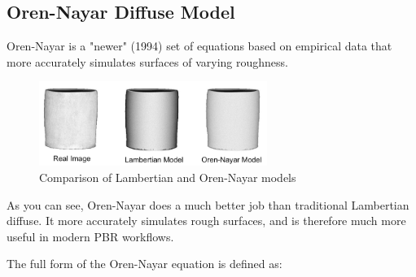 \documentclass[12pt,letterpaper]{article}
\begin{document}
\newpage

\subsection{Oren-Nayar Diffuse Model}

Oren-Nayar is a "newer" (1994) set of equations based on empirical data that more accurately simulates surfaces of varying roughness.

\begin{figure}[htbp]
    \centering
    \includegraphics[width=20em]{Oren-nayar-vase2}
    \caption{Comparison of Lambertian and Oren-Nayar models}
    \label{fig:lambert_orennayar_comparison}
\end{figure}

As you can see, Oren-Nayar does a much better job than traditional Lambertian diffuse. 
It more accurately simulates rough surfaces, and is therefore much more useful in modern PBR workflows.

The full form of the Oren-Nayar equation is defined as:
\end{document}
